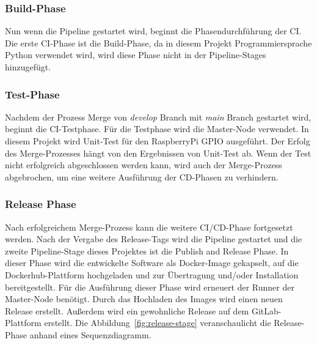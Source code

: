 \subsubsection*{Build-Phase}

Nun wenn die Pipeline gestartet wird, beginnt die Phasendurchführung der \ac{CI}. Die erste \ac{CI}-Phase ist die Build-Phase, da in diesem Projekt Programmiersprache Python verwendet wird, wird diese Phase nicht in der Pipeline-Stages hinzugefügt.

\subsubsection*{Test-Phase}

Nachdem der Prozess Merge von \textit{develop} Branch mit \textit{main} Branch gestartet wird, beginnt die \ac{CI}-Testphase. Für die Testphase wird die Master-Node verwendet. In diesem Projekt wird Unit-Test für den RaspberryPi GPIO ausgeführt. Der Erfolg des Merge-Prozesses hängt von den Ergebnissen von Unit-Test ab. Wenn der Test nicht erfolgreich abgeschlossen werden kann, wird auch der Merge-Prozess abgebrochen, um eine weitere Ausführung der \ac{CD}-Phasen zu verhindern.

\subsubsection*{Release Phase}

Nach erfolgreichem Merge-Prozess kann die weitere \ac{CI/CD}-Phase fortgesetzt werden. Nach der Vergabe des Release-Tags wird die Pipeline gestartet und die zweite Pipeline-Stage dieses Projektes ist die \glqq Publish and Release Phase\grqq. In dieser Phase wird die entwickelte Software als Docker-Image gekapselt, auf die Dockerhub-Plattform hochgeladen und zur Übertragung und/oder Installation bereitgestellt. Für die Ausführung dieser Phase wird erneuert der Runner der Master-Node benötigt. Durch das Hochladen des Images wird einen neuen Release erstellt. Außerdem wird ein gewohnliche Release auf dem GitLab-Plattform erstellt. Die Abbildung~\ref{fig:release-stage} veranschaulicht die Release-Phase anhand eines Sequenzdiagramm.


